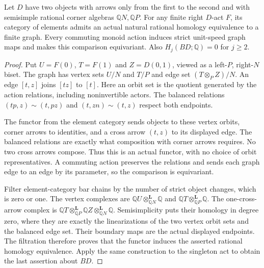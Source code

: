 \begin{lemma}
\label{CP2:A-baseline-semisimple-pair-graph}
Let $D$ have two objects with arrows only from the first
to the second and with semisimple rational corner
algebras $\mathbb QN,\mathbb QP$.  For any finite
right $D$-act $F$, its category of elements admits an
actual natural rational homology equivalence to a
finite graph.  Every commuting monoid action induces
strict unit-speed graph maps and makes this comparison
equivariant.  Also $H_j(BD;\mathbb Q)=0$ for $j\geq2$.
\end{lemma}
\begin{proof}
Put $U=F(0)$, $T=F(1)$ and $Z=D(0,1)$, viewed as
a left-$P$, right-$N$ biset.  The graph has vertex
sets $U/N$ and $T/P$ and edge set
$(T\otimes_P Z)/N$.  An edge $[t,z]$ joins $[tz]$
to $[t]$.  Here an orbit set is the quotient generated
by the action relations, including noninvertible actors.
The balanced relations $(tp,z)\sim(t,pz)$ and
$(t,zn)\sim(t,z)$ respect both endpoints.

The functor from the element category sends objects to
these vertex orbits, corner arrows to identities, and a
cross arrow $(t,z)$ to its displayed edge.  The balanced
relations are exactly what composition with corner
arrows requires.  No two cross arrows compose.  Thus
this is an actual functor, with no choice of orbit
representatives.  A commuting action preserves the
relations and sends each graph edge to an edge by
its parameter, so the comparison is equivariant.

Filter element-category bar chains by the number of
strict object changes, which is zero or one.  The
vertex complexes are
$\mathbb QU\otimes_{\mathbb QN}^{\mathbf L}\mathbb Q$
and
$\mathbb QT\otimes_{\mathbb QP}^{\mathbf L}\mathbb Q$.
The one-cross-arrow complex is
$\mathbb QT\otimes_{\mathbb QP}^{\mathbf L}\mathbb QZ
 \otimes_{\mathbb QN}^{\mathbf L}\mathbb Q$.
Semisimplicity puts their homology in degree zero,
where they are exactly the linearizations of the
two vertex orbit sets and the balanced edge set.
Their boundary maps are the actual displayed
endpoints.  The filtration therefore proves that
the functor induces the asserted rational homology
equivalence.  Apply the same construction to the
singleton act to obtain the last assertion about $BD$.
\end{proof}

